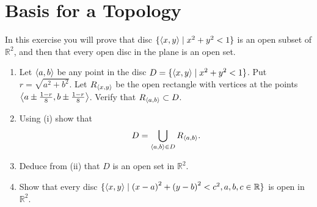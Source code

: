 \section{Basis for a Topology}

\begin{exercise}
	In this exercise you will prove that disc $\{ \left\langle{x,y}\right\rangle \mid x^{2} + y^{2} < 1 \}$ is an open subset of $\mathbb{R}^{2}$, and then that every open disc in the plane is an open set.

	\begin{enumerate}[label={(\roman*)}]
		\item Let $\left\langle{a, b}\right\rangle$ be any point in the disc $D = \{ \left\langle{x, y}\right\rangle \mid x^{2} + y^{2} < 1 \}$. Put $r = \sqrt{a^{2} + b^{2}}$. Let $R_{\left\langle{x, y}\right\rangle}$ be the open rectangle with vertices at the points $\left\langle{a\pm\frac{1-r}{8}, b\pm\frac{1-r}{8}}\right\rangle$. Verify that $R_{\left\langle{a, b}\right\rangle}\subset D$.
		\item Using (i) show that
		      \[
			      D = \bigcup_{\left\langle{a, b}\right\rangle\in D} R_{\left\langle{a, b}\right\rangle}.
		      \]
		\item Deduce from (ii) that $D$ is an open set in $\mathbb{R}^{2}$.
		\item Show that every disc $\{ \left\langle{x, y}\right\rangle \mid {(x-a)}^{2} + {(y-b)}^{2} < c^{2}, a, b, c\in \mathbb{R} \}$ is open in $\mathbb{R}^{2}$.
	\end{enumerate}
\end{exercise}

